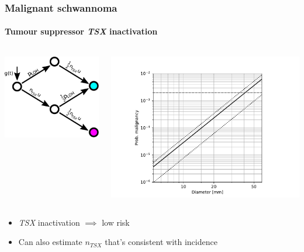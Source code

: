 \documentclass{beamer}
\begin{document}
\begin{frame}
    \frametitle{Malignant schwannoma}
    \framesubtitle{Tumour suppressor \emph{TSX} inactivation}
    \begin{columns}
        \begin{column}{0.45\textwidth}
        \includegraphics[width=\textwidth]{figures/malignancy.pdf}
        \end{column}
        \begin{column}{0.55\textwidth}
        \includegraphics[width=\textwidth]{figures/DiameterTS-oct21}
        \end{column}
    \end{columns}

\begin{itemize}
    \item \emph{TSX} inactivation $\implies$ low risk
    \item Can also estimate $n_{TSX}$ that's consistent with incidence
\end{itemize}
\end{frame}
\end{document}
